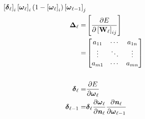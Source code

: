 \documentclass[10pt]{article} %
\begin{document}
\begin{align*}
\left[ \boldsymbol{\delta}_{\ell} \right]_i
\left[ \boldsymbol{\omega}_\ell \right]_i(1 - \left[ \boldsymbol{\omega}_\ell \right]_i) 
\left[ \boldsymbol{\omega}_{\ell - 1} \right]_j \\
\boldsymbol{\Delta}_\ell =& \left[ \frac{\partial E}{\partial \left[ \bold{W}_\ell \right]_{ij}} \right] \\
=& \begin{bmatrix}
a_{11} & \cdots & a_{1n}\\ 
\vdots &  \ddots & \vdots\\ 
a_{m1} & \cdots & a_{mn}
\end{bmatrix}
\\
\\
\boldsymbol{\delta}_{\ell} =& \frac{\partial E}{\partial \boldsymbol{\omega}_{\ell}} \\
\boldsymbol{\delta}_{\ell - 1} =& \boldsymbol{\delta}_{\ell} 
\frac{\partial \boldsymbol{\omega}_{\ell}}{\partial \textbf{\textit{n}}_\ell}
\frac{\partial \textbf{\textit{n}}_\ell}{\partial \boldsymbol{\omega}_{\ell - 1}} \\\end{align*}
\end{document}

